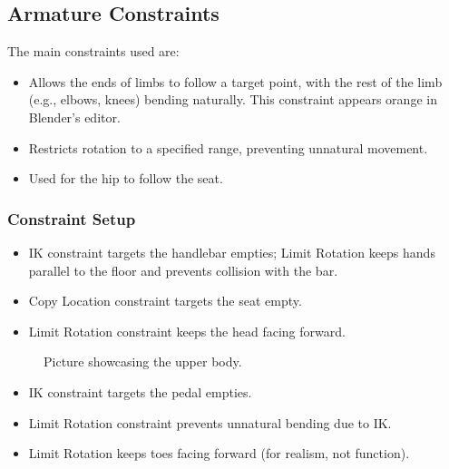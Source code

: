\documentclass[letterpaper,10pt,english]{jupyterBook}
\begin{document}
\subsection{Armature Constraints}
\label{\detokenize{Biker:armature-constraints}}
\sphinxAtStartPar
The main constraints used are:
\begin{itemize}
\item {} 
\sphinxAtStartPar
{} Allows the ends of limbs to follow a target point, with the rest of the limb (e.g., elbows, knees) bending naturally. This constraint appears orange in Blender’s editor.

\item {} 
\sphinxAtStartPar
{} Restricts rotation to a specified range, preventing unnatural movement.

\item {} 
\sphinxAtStartPar
{} Used for the hip to follow the seat.

\end{itemize}


\subsubsection{Constraint Setup}
\label{\detokenize{Biker:constraint-setup}}\begin{itemize}
\item {} 
\sphinxAtStartPar
{} IK constraint targets the handlebar empties; Limit Rotation keeps hands parallel to the floor and prevents collision with the bar.

\item {} 
\sphinxAtStartPar
{} Copy Location constraint targets the seat empty.

\item {} 
\sphinxAtStartPar
{} Limit Rotation constraint keeps the head facing forward.

\end{itemize}

\begin{figure}[htbp]
\centering
\capstart

\noindent{}
\caption{Picture showcasing the upper body.}\label{\detokenize{Biker:biker-top}}\end{figure}
\begin{itemize}
\item {} 
\sphinxAtStartPar
{} IK constraint targets the pedal empties.

\item {} 
\sphinxAtStartPar
{} Limit Rotation constraint prevents unnatural bending due to IK.

\item {} 
\sphinxAtStartPar
{} Limit Rotation keeps toes facing forward (for realism, not function).

\end{itemize}
\end{document}
